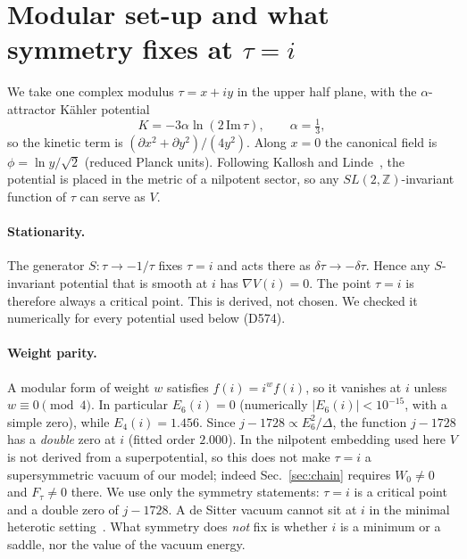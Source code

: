 \documentclass[aps,prd,twocolumn,superscriptaddress,nofootinbib,floatfix]{revtex4-2}
\begin{document}
\section{Modular set-up and what symmetry fixes at $\tau = i$}\label{sec:setup}
We take one complex modulus $\tau = x + i y$ in the upper half plane, with the $\alpha$-attractor K\"ahler potential
\begin{equation}
K = -3\alpha \ln(2\,\mathrm{Im}\,\tau), \qquad \alpha = \tfrac13,
\end{equation}
so the kinetic term is $(\partial x^2 + \partial y^2)/(4y^2)$. Along $x = 0$ the canonical field is $\phi = \ln y/\sqrt{2}$ (reduced Planck units). Following Kallosh and Linde~\cite{arXiv_2408_05203}, the potential is placed in the metric of a nilpotent sector, so any $SL(2,\mathbb{Z})$-invariant function of $\tau$ can serve as $V$.

\paragraph{Stationarity.} The generator $S:\tau\to-1/\tau$ fixes $\tau = i$ and acts there as $\delta\tau \to -\delta\tau$. Hence any $S$-invariant potential that is smooth at $i$ has $\nabla V(i) = 0$. The point $\tau = i$ is therefore always a critical point. This is derived, not chosen. We checked it numerically for every potential used below (D574).

\paragraph{Weight parity.} A modular form of weight $w$ satisfies $f(i) = i^{w} f(i)$, so it vanishes at $i$ unless $w \equiv 0 \pmod 4$. In particular $E_6(i) = 0$ (numerically $|E_6(i)| < 10^{-15}$, with a simple zero), while $E_4(i) = 1.456$. Since $j - 1728 \propto E_6^2/\Delta$, the function $j-1728$ has a \emph{double} zero at $i$ (fitted order $2.000$). In the nilpotent embedding used here $V$ is not derived from a superpotential, so this does not make $\tau=i$ a supersymmetric vacuum of our model; indeed Sec.~\ref{sec:chain} requires $W_0\neq0$ and $F_\tau\neq0$ there. We use only the symmetry statements: $\tau=i$ is a critical point and a double zero of $j-1728$. A de Sitter vacuum cannot sit at $i$ in the minimal heterotic setting~\cite{arXiv_2212_03876}. What symmetry does \emph{not} fix is whether $i$ is a minimum or a saddle, nor the value of the vacuum energy.
\end{document}
